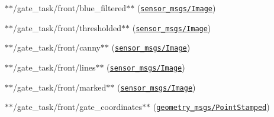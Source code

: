 \begin{DoxyItemize}
\item $\ast$$\ast${\ttfamily /gate\+\_\+task/front/blue\+\_\+filtered}$\ast$$\ast$ (\href{http://docs.ros.org/api/sensor_msgs/html/msg/Image.html}{\tt sensor\+\_\+msgs/\+Image})
\item $\ast$$\ast${\ttfamily /gate\+\_\+task/front/thresholded}$\ast$$\ast$ (\href{http://docs.ros.org/api/sensor_msgs/html/msg/Image.html}{\tt sensor\+\_\+msgs/\+Image})
\item $\ast$$\ast${\ttfamily /gate\+\_\+task/front/canny}$\ast$$\ast$ (\href{http://docs.ros.org/api/sensor_msgs/html/msg/Image.html}{\tt sensor\+\_\+msgs/\+Image})
\item $\ast$$\ast${\ttfamily /gate\+\_\+task/front/lines}$\ast$$\ast$ (\href{http://docs.ros.org/api/sensor_msgs/html/msg/Image.html}{\tt sensor\+\_\+msgs/\+Image})
\item $\ast$$\ast${\ttfamily /gate\+\_\+task/front/marked}$\ast$$\ast$ (\href{http://docs.ros.org/api/sensor_msgs/html/msg/Image.html}{\tt sensor\+\_\+msgs/\+Image})
\item $\ast$$\ast${\ttfamily /gate\+\_\+task/front/gate\+\_\+coordinates}$\ast$$\ast$ (\href{http://docs.ros.org/kinetic/api/geometry_msgs/html/msg/PointStamped.html}{\tt geometry\+\_\+msgs/\+Point\+Stamped})
\end{DoxyItemize}


